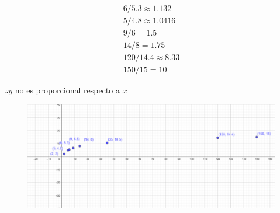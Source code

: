 \documentclass[12pt, letterpaper]{article}
\begin{document}
\begin{align*}
	6 / 5.3  \approx 1.132\\
	5 / 4.8  \approx 1.0416\\
	9 / 6 = 1.5\\
	14 / 8  = 1.75\\
	120 / 14.4  \approx 8.33\\
	150 / 15  = 10
\end{align*}

$\therefore y$ no es proporcional respecto a $x$

\begin{figure}[t]
\centering
\includegraphics[width=40em]{crececinto}
\end{figure}
\end{document}
